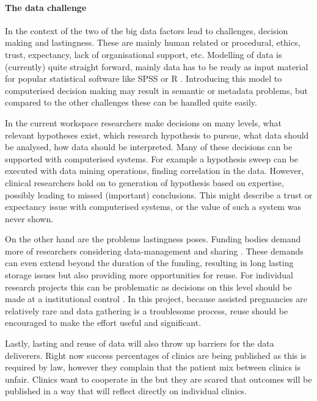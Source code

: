 \paragraph{The data challenge}
In the context of the \project{} two of the big data factors lead to challenges, decision making and lastingness.
These are mainly human related or procedural, \eg{} ethics, trust, expectancy, lack of organisational support, etc.
Modelling of data is (currently) quite straight forward, mainly data has to be ready as input material for popular statistical software like SPSS  or R .
Introducing this model to computerised decision making may result in semantic or metadata problems, but compared to the other challenges these can be handled quite easily.

In the current workspace researchers make decisions on many levels, \eg{} what relevant hypotheses exist, which research hypothesis to pursue, what data should be analysed, how data should be interpreted.
Many of these decisions can be supported with computerised systems.
For example a hypothesis sweep can be executed with data mining operations, finding correlation in the data.
However, clinical researchers hold on to generation of hypothesis based on expertise, possibly leading to missed (important) conclusions.
This might describe a trust or expectancy issue with computerised systems, or the value of such a system was never shown.

On the other hand are the problems lastingness poses.
Funding bodies demand more of researchers considering data-management and sharing \cite{dsb3lynch}.
These demands can even extend beyond the duration of the funding, resulting in long lasting storage issues but also providing more opportunities for reuse.
For individual research projects this can be problematic as decisions on this level should be made at a institutional control \cite{dsb3lynch}.
In this project, because assisted pregnancies are relatively rare and data gathering is a troublesome process, reuse should be encouraged to make the effort useful and significant.

Lastly, lasting and reuse of data will also throw up barriers for the data deliverers.
Right now success percentages of clinics are being published as this is required by law, however they complain that the patient mix between clinics is unfair.
Clinics want to cooperate in the \project{} but they are scared that outcomes will be published in a way that will reflect directly on individual clinics.

